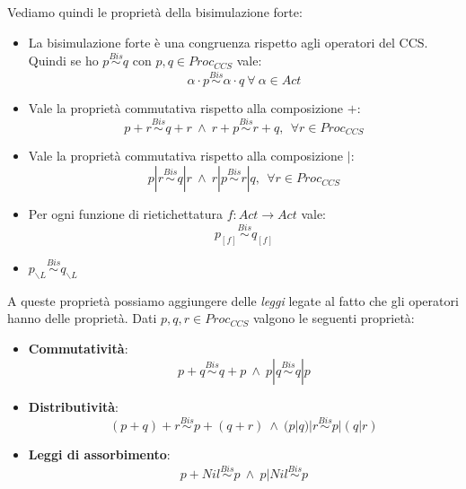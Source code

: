 Vediamo quindi le proprietà della bisimulazione forte:
\begin{itemize}
    \item La bisimulazione forte è una congruenza rispetto agli operatori del CCS.
          Quindi se ho $p \stackrel{Bis}{\sim} q$ con $p, q \in Proc_{CCS}$ vale:
          $$\alpha \cdot p \stackrel{Bis}{\sim}  \alpha \cdot q \ \forall \ \alpha \in Act$$
    \item Vale la proprietà commutativa rispetto alla composizione $+$:
          $$p + r \stackrel{Bis}{\sim} q + r \ \land \ r + p \stackrel{Bis}{\sim} r + q, \ \ \forall r \in Proc_{CCS}$$
    \item Vale la proprietà commutativa rispetto alla composizione $|$:
          $$p | r \stackrel{Bis}{\sim} q | r \ \land \ r | p \stackrel{Bis}{\sim} r | q, \ \ \forall r \in Proc_{CCS}$$
    \item Per ogni funzione di rietichettatura $f : Act \to Act$ vale:
          $$p_{[f]} \stackrel{Bis}{\sim} q_{[f]}$$
    \item $p_{\backslash L} \stackrel{Bis}{\sim} q_{\backslash L}$
\end{itemize}
A queste proprietà possiamo aggiungere delle \textit{leggi} legate al fatto che
gli operatori hanno delle proprietà. Dati $p, q, r \in Proc_{CCS}$ valgono le seguenti proprietà:
\begin{itemize}
    \item \textbf{Commutatività}: $$p + q \stackrel{Bis}{\sim} q + p \ \land \ p | q \stackrel{Bis}{\sim} q | p$$
    \item \textbf{Distributività}: $$(p + q) + r \stackrel{Bis}{\sim} p + (q + r) \ \land \ (p | q) | r \stackrel{Bis}{\sim} p | (q | r)$$
    \item \textbf{Leggi di assorbimento}: $$p + Nil \stackrel{Bis}{\sim} p \ \land \ p | Nil \stackrel{Bis}{\sim} p$$
\end{itemize}
